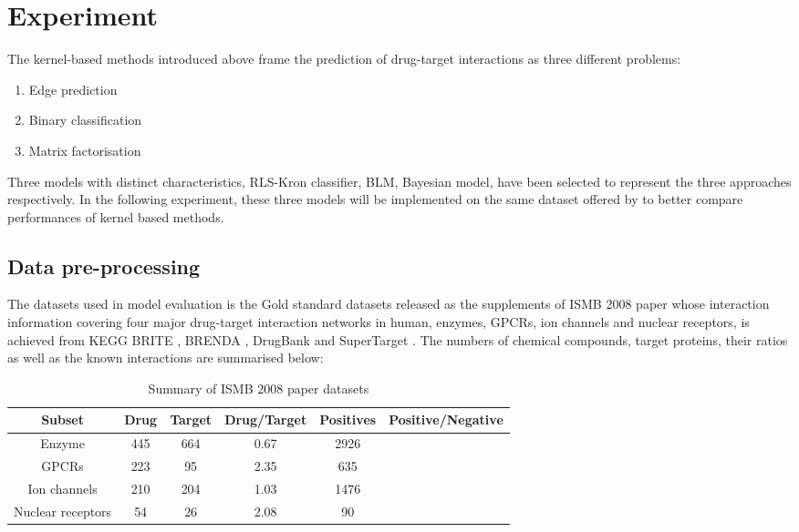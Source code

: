 \documentclass[a4paper,12pt]{report}
\begin{document}
\chapter{Experiment}

The kernel-based methods introduced above frame the prediction of drug-target interactions as three different problems: 
\begin{enumerate}
\item{Edge prediction}
\item{Binary classification}
\item{Matrix factorisation}
\end{enumerate}

Three models with distinct characteristics, RLS-Kron classifier\citep{van11}, BLM\citep{ble09}, Bayesian model\citep{gon12}, have been selected to represent the three approaches respectively. In the following experiment, these three models will be implemented on the same dataset offered by \citet{ble09} to better compare performances of kernel based methods.

\section{Data pre-processing}

The datasets used in model evaluation is the Gold standard datasets released as the supplements of ISMB 2008 paper \citep{yam08} whose interaction information covering four major drug-target interaction networks in human, enzymes, GPCRs, ion channels and nuclear receptors, is achieved from KEGG BRITE \citep{kan06}, BRENDA \citep{sch04}, DrugBank \citep{wis08} and SuperTarget \citep{gun08}. The numbers of chemical compounds, target proteins, their ratios as well as the known interactions are summarised below:
\begin{table}[h]
\centering
\begin{tabular}{cccccc}\hline
Subset & Drug & Target & Drug/Target & Positives & Positive/Negative\\ \hline
Enzyme & 445 & 664 & 0.67 & 2926 & \\
GPCRs & 223 & 95 & 2.35 & 635 & \\ 
Ion channels & 210 & 204 & 1.03 & 1476 & \\
Nuclear receptors & 54 & 26 & 2.08 & 90 &\\ \hline
\end{tabular}
\caption{Summary of ISMB 2008 paper datasets}
\end{table}
\end{document}
